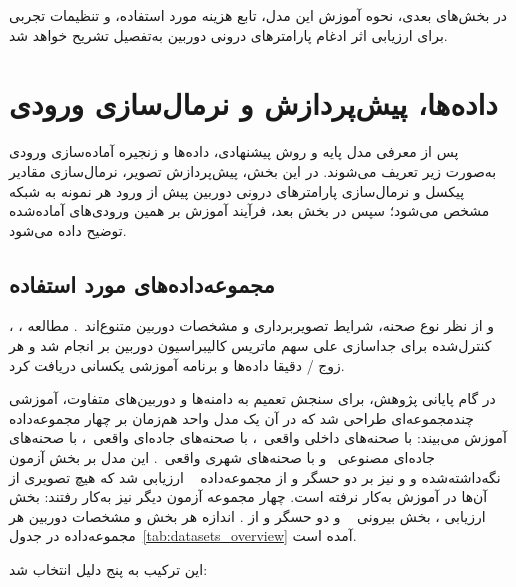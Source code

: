 در بخش‌های بعدی، نحوه آموزش این مدل، تابع هزینه مورد استفاده، و تنظیمات تجربی برای ارزیابی اثر ادغام پارامترهای درونی دوربین به‌تفصیل تشریح خواهد شد.

\section{داده‌ها، پیش‌پردازش و نرمال‌سازی ورودی}
\label{sec:data_preprocessing}

پس از معرفی مدل پایه و روش پیشنهادی، داده‌ها و زنجیره آماده‌سازی ورودی به‌صورت زیر تعریف می‌شوند. در این بخش، پیش‌پردازش تصویر، نرمال‌سازی مقادیر پیکسل و نرمال‌سازی پارامترهای درونی دوربین پیش از ورود هر نمونه به شبکه مشخص می‌شود؛ سپس در بخش بعد، فرآیند آموزش بر همین ورودی‌های آماده‌شده توضیح داده می‌شود.

\subsection{مجموعه‌داده‌های مورد استفاده}

 ، ،  و  از نظر نوع صحنه، شرایط تصویربرداری و مشخصات دوربین متنوع‌اند~\cite{Gaidon2016VKITTI,Silberman2012NYUv2,Vasiljevic2019DIODE,Cordts2016Cityscapes}. مطالعه کنترل‌شده برای جداسازی علی سهم ماتریس کالیبراسیون دوربین بر  انجام شد و هر زوج \proposedmodel{}/\controlmodel{} دقیقا داده‌ها و برنامه آموزشی یکسانی دریافت کرد.

در گام پایانی پژوهش، برای سنجش تعمیم \proposedmodel{} به دامنه‌ها و دوربین‌های متفاوت، آموزشی چندمجموعه‌ای طراحی شد که در آن یک مدل واحد هم‌زمان بر چهار مجموعه‌داده آموزش می‌بیند:  با صحنه‌های داخلی واقعی~\cite{Silberman2012NYUv2}،  با صحنه‌های جاده‌ای واقعی~\cite{Geiger2012KITTI}،  با صحنه‌های جاده‌ای مصنوعی~\cite{Gaidon2016VKITTI,Cabon2020VKITTI2} و  با صحنه‌های شهری واقعی~\cite{Cordts2016Cityscapes}. این مدل بر بخش آزمون نگه‌داشته‌شده  و  و نیز بر دو حسگر  و  از مجموعه‌داده ~\cite{Song2015SUNRGBD} ارزیابی شد که هیچ تصویری از آن‌ها در آموزش به‌کار نرفته است. چهار مجموعه آزمون دیگر نیز به‌کار رفتند: بخش ارزیابی ، بخش بیرونی ~\cite{Vasiljevic2019DIODE} و دو حسگر  و  از . اندازه هر بخش و مشخصات دوربین هر مجموعه‌داده در جدول~\ref{tab:datasets_overview} آمده است.

این ترکیب به پنج دلیل انتخاب شد:

